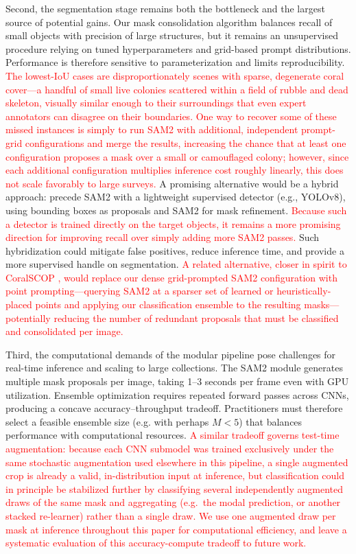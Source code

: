 \documentclass[11pt]{elsarticle}
\newcommand{\revadd}[1]{\textcolor{red}{#1}}
\begin{document}
Second, the segmentation stage remains both the bottleneck and the largest source of potential gains. Our mask consolidation algorithm balances recall of small objects with precision of large structures, but it remains an unsupervised procedure relying on tuned hyperparameters and grid-based prompt distributions. Performance is therefore sensitive to parameterization and limits reproducibility. \revadd{The lowest-IoU cases are disproportionately scenes with sparse, degenerate coral cover---a handful of small live colonies scattered within a field of rubble and dead skeleton, visually similar enough to their surroundings that even expert annotators can disagree on their boundaries. One way to recover some of these missed instances is simply to run SAM2 with additional, independent prompt-grid configurations and merge the results, increasing the chance that at least one configuration proposes a mask over a small or camouflaged colony; however, since each additional configuration multiplies inference cost roughly linearly, this does not scale favorably to large surveys.} A promising alternative would be a hybrid approach: precede SAM2 with a lightweight supervised detector (e.g., YOLOv8), using bounding boxes as proposals and SAM2 for mask refinement. \revadd{Because such a detector is trained directly on the target objects, it remains a more promising direction for improving recall over simply adding more SAM2 passes.} Such hybridization could mitigate false positives, reduce inference time, and provide a more supervised handle on segmentation. \revadd{A related alternative, closer in spirit to CoralSCOP \citep{zheng2024}, would replace our dense grid-prompted SAM2 configuration with point prompting---querying SAM2 at a sparser set of learned or heuristically-placed points and applying our classification ensemble to the resulting masks---potentially reducing the number of redundant proposals that must be classified and consolidated per image.}

Third, the computational demands of the modular pipeline pose challenges for real-time inference and scaling to large collections. The SAM2 module generates multiple mask proposals per image, taking 1--3 seconds per frame even with GPU utilization. Ensemble optimization requires repeated forward passes across CNNs, producing a concave accuracy--throughput tradeoff. Practitioners must therefore select a feasible ensemble size (e.g. with perhaps $M<5$) that balances performance with computational resources. \revadd{A similar tradeoff governs test-time augmentation: because each CNN submodel was trained exclusively under the same stochastic augmentation used elsewhere in this pipeline, a single augmented crop is already a valid, in-distribution input at inference, but classification could in principle be stabilized further by classifying several independently augmented draws of the same mask and aggregating (e.g.\ the modal prediction, or another stacked re-learner) rather than a single draw. We use one augmented draw per mask at inference throughout this paper for computational efficiency, and leave a systematic evaluation of this accuracy-compute tradeoff to future work.}
\end{document}
